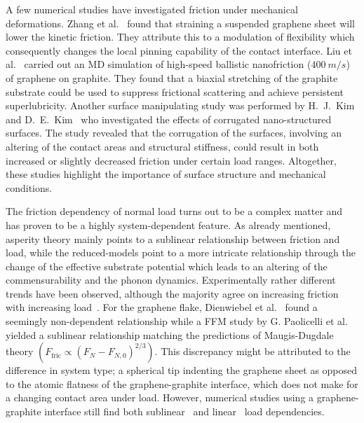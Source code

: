 

A few numerical studies have investigated friction under mechanical deformations.
Zhang et al.~\cite{zhang_tuning_2019} found that straining a suspended graphene
sheet will lower the kinetic friction. They attribute this to a modulation of
flexibility which consequently changes the local pinning capability of the
contact interface. Liu et al.~\cite{liu_high-speed_2014} carried out an
\acrshort{MD} simulation of high-speed ballistic nanofriction ($\SI{400}{m/s}$)
of graphene on graphite. They found that a biaxial stretching of the graphite 
substrate could be used to suppress frictional scattering and achieve persistent
superlubricity. Another surface manipulating study was performed by H.\ J.\ Kim
and D.\ E.\ Kim~\cite{Kim_2012} who investigated the effects of corrugated
nano-structured surfaces. The study revealed that the corrugation of the surfaces, involving an altering of the contact areas and structural stiffness, could result in both increased or
slightly decreased friction under certain load ranges. Altogether, these studies
highlight the importance of surface structure and mechanical conditions. 


The friction dependency of normal load turns out to be a complex matter and has
proven to be a highly system-dependent feature. As already mentioned, asperity
theory mainly points to a sublinear relationship between friction and load,
while the reduced-models point to a more intricate relationship through
the change of the effective substrate potential which leads to an altering of
the commensurability and the phonon dynamics. Experimentally rather different trends have been observed, although the majority agree on increasing friction with
increasing load~\cite[p. 200]{gnecco_meyer_2015}. For the graphene flake,
Dienwiebel et al.~\cite{DIENWIEBEL2005197} found a seemingly non-dependent
relationship while a \acrshort{FFM} study by G. Paolicelli et al.~\cite{Paolicelli_2015} yielded a sublinear relationship matching the predictions of
Maugis-Dugdale theory $(F_{\text{fric}} \propto (F_N - F_{N,0})^{2/3})$. This discrepancy
might be attributed to the difference in system type; a spherical tip indenting the graphene sheet as opposed to the atomic flatness of the graphene-graphite
interface, which does not make for a changing contact area under load. However,
numerical studies using a graphene-graphite interface still find both sublinear~\cite{bonelli_atomistic_2009} and linear~\cite{ma12091425, zhang_tuning_2019}
load dependencies. 


